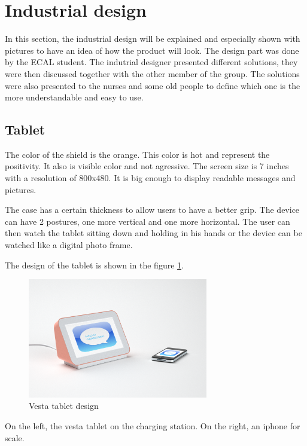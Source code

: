 \section{Industrial design}

In this section, the industrial design will be explained and especially shown with pictures to have an idea of how the product will look. The design part was done by the ECAL student. The indutrial designer presented different solutions, they were then discussed together with the other member of the group. The solutions were also presented to the nurses and some old people to define which one is the more understandable and easy to use.

\subsection{Tablet}

The color of the shield is the orange. This color is hot and represent the positivity. It also is visible color and not agressive. The screen size is 7 inches with a resolution of 800x480. It is big enough to display readable messages and pictures.

The case has a certain thickness to allow users to have a better grip. The device can have 2 postures, one more vertical and one more horizontal. The user can then watch the tablet sitting down and holding in his hands or the device can be watched like a digital photo frame.

The design of the tablet is shown in the figure \ref{fig:vesta design}.

\begin{figure}[!htb]
    \centering
    \includegraphics[width=0.7\textwidth,keepaspectratio]{chap/designFig/VestaRender4.png}
    \caption{Vesta tablet design}
    \label{fig:vesta design}
\end{figure}

On the left, the vesta tablet on the charging station. On the right, an iphone for scale.


